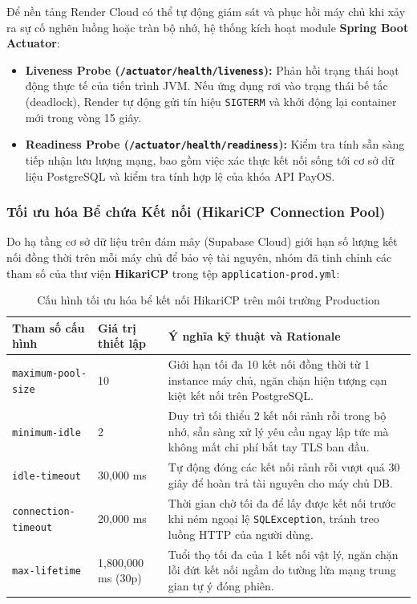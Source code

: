 Để nền tảng Render Cloud có thể tự động giám sát và phục hồi máy chủ khi xảy ra sự cố nghẽn luồng hoặc tràn bộ nhớ, hệ thống kích hoạt module \textbf{Spring Boot Actuator}:
\begin{itemize}
    \item \textbf{Liveness Probe (\texttt{/actuator/health/liveness}):} Phản hồi trạng thái hoạt động thực tế của tiến trình JVM. Nếu ứng dụng rơi vào trạng thái bế tắc (deadlock), Render tự động gửi tín hiệu \texttt{SIGTERM} và khởi động lại container mới trong vòng 15 giây.
    \item \textbf{Readiness Probe (\texttt{/actuator/health/readiness}):} Kiểm tra tính sẵn sàng tiếp nhận lưu lượng mạng, bao gồm việc xác thực kết nối sống tới cơ sở dữ liệu PostgreSQL và kiểm tra tính hợp lệ của khóa API PayOS.
\end{itemize}

\subsubsection{Tối ưu hóa Bể chứa Kết nối (HikariCP Connection Pool)}

Do hạ tầng cơ sở dữ liệu trên đám mây (Supabase Cloud) giới hạn số lượng kết nối đồng thời trên mỗi máy chủ để bảo vệ tài nguyên, nhóm đã tinh chỉnh các tham số của thư viện \textbf{HikariCP} trong tệp \texttt{application-prod.yml}:

\begin{table}[H]
\centering
\caption{Cấu hình tối ưu hóa bể kết nối HikariCP trên môi trường Production}
\label{tab:hikaricp-config}
\renewcommand{\arraystretch}{1.3}
\begin{tabular}{|p{4.5cm}|p{3cm}|p{7cm}|}
\hline
\textbf{Tham số cấu hình} & \textbf{Giá trị thiết lập} & \textbf{Ý nghĩa kỹ thuật và Rationale} \\
\hline
\texttt{maximum-pool-size} & 10 & Giới hạn tối đa 10 kết nối đồng thời từ 1 instance máy chủ, ngăn chặn hiện tượng cạn kiệt kết nối trên PostgreSQL. \\
\hline
\texttt{minimum-idle} & 2 & Duy trì tối thiểu 2 kết nối rảnh rỗi trong bộ nhớ, sẵn sàng xử lý yêu cầu ngay lập tức mà không mất chi phí bắt tay TLS ban đầu. \\
\hline
\texttt{idle-timeout} & 30,000 ms & Tự động đóng các kết nối rảnh rỗi vượt quá 30 giây để hoàn trả tài nguyên cho máy chủ DB. \\
\hline
\texttt{connection-timeout} & 20,000 ms & Thời gian chờ tối đa để lấy được kết nối trước khi ném ngoại lệ \texttt{SQLException}, tránh treo luồng HTTP của người dùng. \\
\hline
\texttt{max-lifetime} & 1,800,000 ms (30p) & Tuổi thọ tối đa của 1 kết nối vật lý, ngăn chặn lỗi đứt kết nối ngầm do tường lửa mạng trung gian tự ý đóng phiên. \\
\hline
\end{tabular}
\end{table}

